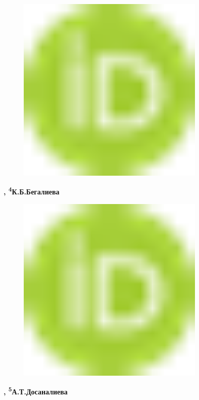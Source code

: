 \begin{figure}[H]
	\centering
	\includegraphics[width=0.8\textwidth]{media/ict/image16}
	\caption*{}
\end{figure}
{\bfseries ,
\textsuperscript{4}К.Б.Бегалиева}
\begin{figure}[H]
	\centering
	\includegraphics[width=0.8\textwidth]{media/ict/image16}
	\caption*{}
\end{figure}
{\bfseries ,
\textsuperscript{5}А.Т.Досаналиева}
